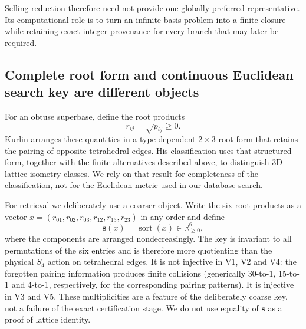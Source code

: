 \documentclass[11pt]{article}
\newcommand{\sortkey}{\mathbf{s}}
\begin{document}
Selling reduction therefore need not provide one globally preferred representative. Its computational role is to turn an infinite basis problem into a finite closure while retaining exact integer provenance for every branch that may later be required.

\subsection{Complete root form and continuous Euclidean search key are different objects}

For an obtuse superbase, define the root products
\begin{equation}
r_{ij}=\sqrt{p_{ij}}\ge 0.
\end{equation}
Kurlin arranges these quantities in a type-dependent $2\times3$ root form that retains the pairing of opposite tetrahedral edges. His classification uses that structured form, together with the finite alternatives described above, to distinguish 3D lattice isometry classes. We rely on that result for completeness of the classification, not for the Euclidean metric used in our database search.

For retrieval we deliberately use a coarser object. Write the six root products as a vector $x=(r_{01},r_{02},r_{03},r_{12},r_{13},r_{23})$ in any order and define
\begin{equation}
\sortkey(x)=\operatorname{sort}(x)\in\mathbb R_{\ge0}^6,
\end{equation}
where the components are arranged nondecreasingly. The key is invariant to all permutations of the six entries and is therefore more quotienting than the physical $S_4$ action on tetrahedral edges. It is not injective in V1, V2 and V4: the forgotten pairing information produces finite collisions (generically 30-to-1, 15-to-1 and 4-to-1, respectively, for the corresponding pairing patterns). It is injective in V3 and V5. These multiplicities are a feature of the deliberately coarse key, not a failure of the exact certification stage. We do not use equality of $\sortkey$ as a proof of lattice identity.
\end{document}
